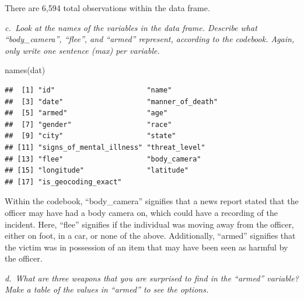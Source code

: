 \documentclass[
]{article}
\newenvironment{Shaded}{\begin{snugshade}}{\end{snugshade}}
\newcommand{\FunctionTok}[1]{\textcolor[rgb]{0.00,0.00,0.00}{#1}}
\newcommand{\NormalTok}[1]{#1}
\newcommand{\SpecialCharTok}[1]{\textcolor[rgb]{0.00,0.00,0.00}{#1}}
\begin{document}
There are 6,594 total observations within the data frame.

\emph{c.~Look at the names of the variables in the data frame. Describe
what ``body\_camera'', ``flee'', and ``armed'' represent, according to
the codebook. Again, only write one sentence (max) per variable.}

\begin{Shaded}
\begin{Highlighting}[]
\FunctionTok{names}\NormalTok{(dat)}
\end{Highlighting}
\end{Shaded}

\begin{verbatim}
##  [1] "id"                      "name"                   
##  [3] "date"                    "manner_of_death"        
##  [5] "armed"                   "age"                    
##  [7] "gender"                  "race"                   
##  [9] "city"                    "state"                  
## [11] "signs_of_mental_illness" "threat_level"           
## [13] "flee"                    "body_camera"            
## [15] "longitude"               "latitude"               
## [17] "is_geocoding_exact"
\end{verbatim}

Within the codebook, ``body\_camera'' signifies that a news report
stated that the officer may have had a body camera on, which could have
a recording of the incident. Here, ``flee'' signifies if the individual
was moving away from the officer, either on foot, in a car, or none of
the above. Additionally, ``armed'' signifies that the victim was in
possession of an item that may have been seen as harmful by the officer.

\emph{d.~What are three weapons that you are surprised to find in the
``armed'' variable? Make a table of the values in ``armed'' to see the
options.}

\begin{Shaded}
\end{Shaded}
\end{document}
